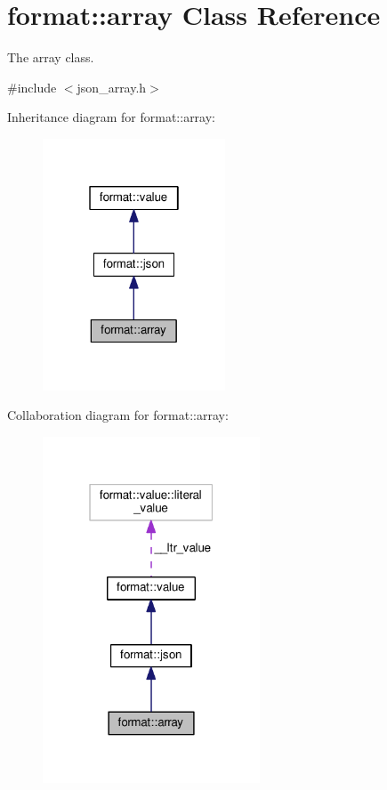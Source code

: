 \hypertarget{classformat_1_1array}{}\section{format\+:\+:array Class Reference}
\label{classformat_1_1array}


The array class.  




{\ttfamily \#include $<$json\+\_\+array.\+h$>$}



Inheritance diagram for format\+:\+:array\+:
\nopagebreak
\begin{figure}[H]
\begin{center}
\leavevmode
\includegraphics[width=154pt]{classformat_1_1array__inherit__graph}
\end{center}
\end{figure}


Collaboration diagram for format\+:\+:array\+:
\nopagebreak
\begin{figure}[H]
\begin{center}
\leavevmode
\includegraphics[width=183pt]{classformat_1_1array__coll__graph}
\end{center}
\end{figure}
